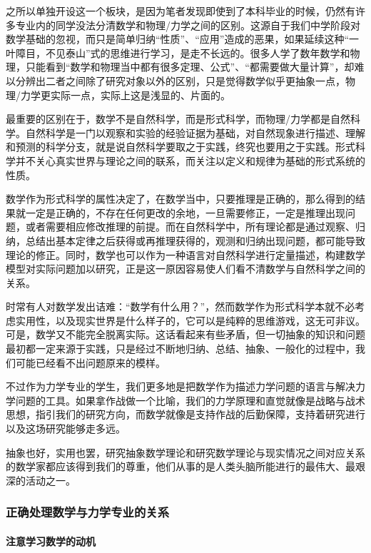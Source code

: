 之所以单独开设这一个板块，是因为笔者发现即使到了本科毕业的时候，仍然有许多专业内的同学没法分清数学和物理/力学之间的区别。这源自于我们中学阶段对数学基础的忽视，而只是简单归纳“性质”、“应用”造成的恶果，如果延续这种“一叶障目，不见泰山”式的思维进行学习，是走不长远的。很多人学了数年数学和物理，只能看到“数学和物理当中都有很多定理、公式”、“都需要做大量计算”，却难以分辨出二者之间除了研究对象以外的区别，只是觉得数学似乎更抽象一点，物理/力学更实际一点，实际上这是浅显的、片面的。

最重要的区别在于，数学不是自然科学，而是形式科学，而物理/力学都是自然科学。自然科学是一门以观察和实验的经验证据为基础，对自然现象进行描述、理解和预测的科学分支，就是说自然科学要取之于实践，终究也要用之于实践。形式科学并不关心真实世界与理论之间的联系，而关注以定义和规律为基础的形式系统的性质。

数学作为形式科学的属性决定了，在数学当中，只要推理是正确的，那么得到的结果就一定是正确的，不存在任何更改的余地，一旦需要修正，一定是推理出现问题，或者需要相应修改推理的前提。而在自然科学中，所有理论都是通过观察、归纳，总结出基本定律之后获得或再推理获得的，观测和归纳出现问题，都可能导致理论的修正。同时，数学也可以作为一种语言对自然科学进行定量描述，构建数学模型对实际问题加以研究，正是这一原因容易使人们看不清数学与自然科学之间的关系。

时常有人对数学发出诘难：“数学有什么用？”，然而数学作为形式科学本就不必考虑实用性，以及现实世界是什么样子的，它可以是纯粹的思维游戏，这无可非议。可是，数学又不能完全脱离实际。这话看起来有些矛盾，但一切抽象的知识和问题最初都一定来源于实践，只是经过不断地归纳、总结、抽象、一般化的过程中，我们可能已经看不出问题原来的模样。

不过作为力学专业的学生，我们更多地是把数学作为描述力学问题的语言与解决力学问题的工具。如果拿作战做一个比喻，我们的力学原理和直觉就像是战略与战术思想，指引我们的研究方向，而数学就像是支持作战的后勤保障，支持着研究进行以及这场研究能够走多远。

抽象也好，实用也罢，研究抽象数学理论和研究数学理论与现实情况之间对应关系的数学家都应该得到我们的尊重，他们从事的是人类头脑所能进行的最伟大、最艰深的活动之一。

\subsubsection{正确处理数学与力学专业的关系}

\paragraph{注意学习数学的动机}

